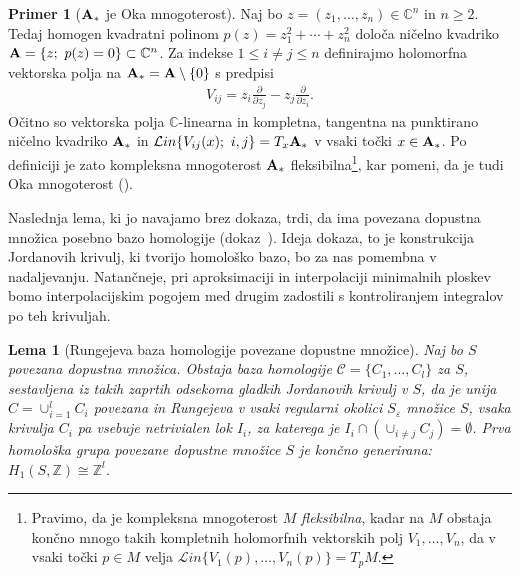 \documentclass[12pt,a4paper,twoside]{article}
\theoremstyle{definition} %
\newtheorem{primer}[definicija]{Primer}
\theoremstyle{plain} %
\newtheorem{lema}[definicija]{Lema}
\numberwithin{equation}{section}  %
\begin{document}
\begin{primer} [$\textbf{\textup{A}}_{*}$ je Oka mnogoterost] \label{primer-oka}
Naj bo $z = (z_{1}, \dots , z_{n}) \in \mathbb{C}^{n}$ in $n \geq 2$. Tedaj  homogen kvadratni polinom $p(z) = z_{1}^{2} + \cdots + z_{n}^{2}$ določa ničelno kvadriko $\textbf{\textup{A}} = \{z ; \ p(z)=0 \} \subset \mathbb{C}^{n}$.
Za indekse $1 \leq i \neq j \leq n$ definirajmo holomorfna vektorska polja na $ \textbf{\textup{A}}_{*} = \textbf{\textup{A}} \setminus \{ 0 \}$ s predpisi
\begin{gather*}
V_{ij} = z_{i} \frac{\partial}{\partial z_{j}} - z_{j} \frac{\partial}{\partial z_{i}}.
\end{gather*}
Očitno so vektorska polja $\mathbb{C}$-linearna in kompletna, tangentna na punktirano ničelno kvadriko $\textbf{\textup{A}}_{*}$ in $\mathcal{L}in \{ V_{ij}(x) ; \ i,j \} = T_{x}\textbf{\textup{A}}_{*}$ v vsaki točki $x \in \textbf{\textup{A}}_{*}$. Po definiciji je zato kompleksna mnogoterost $\textbf{\textup{A}}_{*}$ fleksibilna\footnote{Pravimo, da je kompleksna mnogoterost $M$ \emph{fleksibilna}, kadar na $M$ obstaja končno mnogo takih kompletnih holomorfnih vektorskih polj $V_{1}, \dots , V_{n}$, da v vsaki točki $p \in M$ velja $\mathcal{L}in \{ V_{1}(p), \dots , V_{n}(p) \} = T_{p}M$.}, 
kar pomeni, da je tudi Oka mnogoterost (\cite[Definition~1.13.7]{alarcon2021minimal}). 
\end{primer}

Naslednja lema, ki jo navajamo brez dokaza, trdi, da ima povezana dopustna množica posebno bazo homologije (dokaz~\cite[str.~69--71]{alarcon2021minimal}). Ideja dokaza, to je konstrukcija Jordanovih krivulj, ki tvorijo homološko bazo, bo za nas pomembna v nadaljevanju. Natančneje, pri aproksimaciji in interpolaciji minimalnih ploskev bomo interpolacijskim pogojem med drugim zadostili s kontroliranjem integralov po teh krivuljah.

\begin{lema} [Rungejeva baza homologije povezane dopustne množice] \label{lema:Runge-hom-baza}
Naj bo $S$ povezana dopustna množica. Obstaja baza homologije $\mathcal{C} = \{ C_{1}, \dots , C_{l} \}$ za $S$, sestavljena iz takih zaprtih odsekoma gladkih Jordanovih krivulj v $S$, da je unija $C = \cup_{i=1}^{l} C_{i}$ povezana in Rungejeva v vsaki regularni okolici $S_{\varepsilon}$ množice $S$, vsaka krivulja $C_{i}$ pa vsebuje netrivialen lok $I_{i}$, za katerega je $I_{i} \cap (\cup_{i \neq j} C_{j}) = \emptyset$.
Prva homološka grupa povezane dopustne množice $S$ je končno generirana: $H_{1}(S, \mathbb{Z}) \cong \mathbb{Z}^{l}$.
\end{lema}
\end{document}
